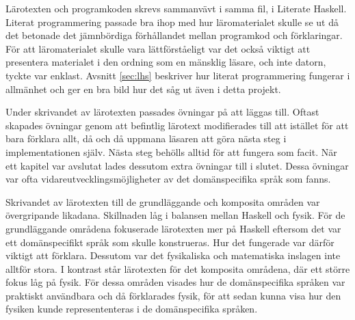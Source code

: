\begin{draft}

Lärotexten och programkoden skrevs sammanvävt i samma fil, i Literate
Haskell. Literat programmering passade bra ihop med
hur läromaterialet skulle se ut då det betonade det jämnbördiga förhållandet
mellan programkod och förklaringar. För att läromaterialet skulle vara
lättförståeligt var det också viktigt att presentera materialet i den ordning
som en mänsklig läsare, och inte datorn, tyckte var enklast. Avsnitt \ref{sec:lhs} beskriver hur literat programmering fungerar i allmänhet och ger en bra bild hur det såg ut även i detta projekt.

Under skrivandet av lärotexten passades övningar på att läggas till. Oftast skapades övningar genom att befintlig lärotext modifierades till att istället för att bara förklara allt, då och då uppmana läsaren att göra nästa steg i implementationen själv. Nästa steg behölls alltid för att fungera som facit. När ett kapitel var avslutat lades dessutom extra övningar till i slutet. Dessa övningar var ofta vidareutvecklingsmöjligheter av det domänspecifika språk som fanns.

Skrivandet av lärotexten till de grundläggande och komposita områden var övergripande likadana. Skillnaden låg i balansen mellan Haskell och fysik. För de grundläggande områdena fokuserade lärotexten mer på Haskell eftersom det var ett domänspecifikt språk som skulle konstrueras. Hur det fungerade var därför viktigt att förklara. Dessutom var det fysikaliska och matematiska inslagen inte alltför stora. I kontrast står lärotexten för det komposita områdena, där ett större fokus låg på fysik. För dessa områden visades hur de domänspecifika språken var praktiskt användbara och då förklarades fysik, för att sedan kunna visa hur den fysiken kunde represententeras i de domänspecifika språken.

\end{draft}
